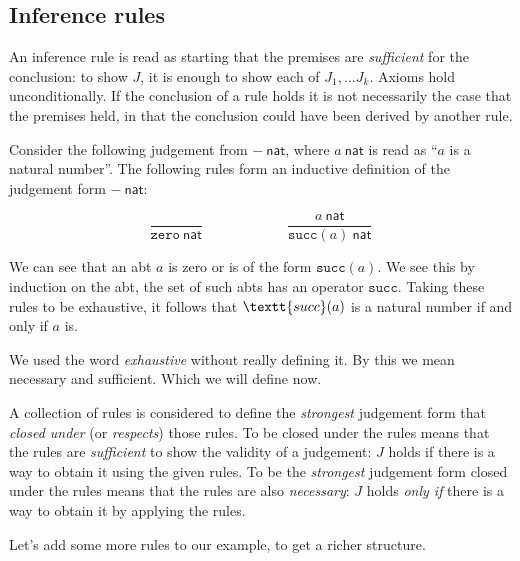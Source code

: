 \subsection{Inference rules}

\begin{remark}
    An inference rule is read as starting that the premises are \emph{sufficient} for the conclusion: to show $J$, it is enough to show each of $J_1, \dots J_k$. Axioms hold unconditionally. If the conclusion of a rule holds it is not necessarily the case that the premises held, in that the conclusion could have been derived by another rule.
\end{remark}

\begin{example}
    Consider the following judgement from $-\ \mathsf{nat}$, where $a\ \mathsf{nat}$ is read as ``$a$ is a natural number''. The following rules form an inductive definition of the judgement form $-\ \mathsf{nat}$:

    $$\frac
        {}
        {\texttt{zero}\ \mathsf{nat}}
      \qquad\qquad\qquad
      \frac
        {a\ \mathsf{nat}}
        {\texttt{succ}(a)\ \mathsf{nat}}
    $$

    We can see that an abt $a$ is zero or is of the form $\texttt{succ}(a)$. We see this by induction on the abt, the set of such abts has an operator $\texttt{succ}$. Taking these rules to be exhaustive, it follows that $\textt{succ}(a)$ is a natural number if and only if $a$ is.
\end{example}

\begin{remark}
    We used the word \emph{exhaustive} without really defining it. By this we mean necessary and sufficient. Which we will define now.
\end{remark}

\begin{defin}
    A collection of rules is considered to define the \emph{strongest} judgement form that \emph{closed under} (or \emph{respects}) those rules. To be closed under the rules means that the rules are \emph{sufficient} to show the validity of a judgement: $J$ holds if there is a way to obtain it using the given rules. To be the \emph{strongest} judgement form closed under the rules means that the rules are also \emph{necessary}: $J$ holds \emph{only if} there is a way to obtain it by applying the rules.
\end{defin}

Let's add some more rules to our example, to get a richer structure.

